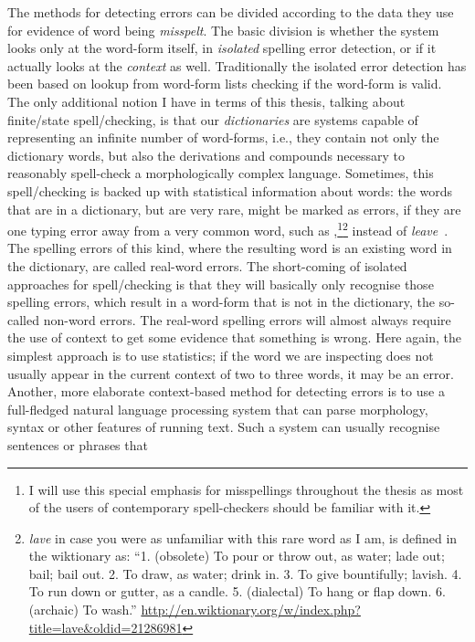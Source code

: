 \documentclass[officiallayout]{unihelcompling}
\newcommand\misspelt{\bgroup\markoverwith
{\textcolor{red}{\lower3.5pt\hbox{\sixly \char58}}}\ULon}
\begin{document}
The methods for detecting errors can be divided according to the data they use
for evidence of word being \emph{misspelt}. The basic division is whether the
system looks only at the \gls{word-form} itself, in \emph{isolated} spelling
error detection, or if it actually looks at the \emph{context} as well.
Traditionally the isolated error detection has been based on lookup from
word-form lists checking if the word-form is valid. The only additional notion
I have in terms of this thesis, talking about finite\-/state spell\-/checking,
is that our \emph{dictionaries} are systems capable of representing an infinite
number of word-forms, i.e., they contain not only the dictionary words, but
also the derivations and compounds necessary to reasonably spell-check a
morphologically complex language. Sometimes, this spell\-/checking is backed up
with statistical information about words: the words that are in a dictionary,
but are very rare, might be marked as errors, if they are one typing error away
from a very common word, such as \misspelt{lave},\footnote{I will use this
    special emphasis for misspellings throughout the thesis as most of the
    users of contemporary spell-checkers should be familiar with
it.}\footnote{\emph{lave} in case you were as unfamiliar with this rare word
    as I am, is defined in the wiktionary as: ``1. (obsolete) To pour or throw
    out, as water; lade out; bail; bail out. 2. To draw, as water; drink in. 3.
To give bountifully; lavish. 4. To run down or gutter, as a candle. 5.
(dialectal) To hang or flap down. 6. (archaic) To wash.''
\url{http://en.wiktionary.org/w/index.php?title=lave&oldid=21286981}} instead
of \emph{leave}~\citep{kukich1992techniques}.  The spelling errors of this
kind, where the resulting word is an existing word in the dictionary, are
called \glspl{real-word error}.  The short-coming of isolated approaches
for spell\-/checking is that they will basically only recognise those spelling
errors, which result in a word-form that is not in the dictionary, the
so-called \glspl{non-word error}. The real-word spelling errors
will almost always require the use of context to get some evidence that
something is wrong. Here again, the simplest approach is to use statistics; if
the word we are inspecting does not usually appear in the current context of
two to three words, it may be an error. Another, more elaborate context-based
method for detecting errors is to use a full-fledged natural language
processing system that can parse morphology, syntax or other features of
running text.  Such a system can usually recognise sentences or phrases that
\end{document}
